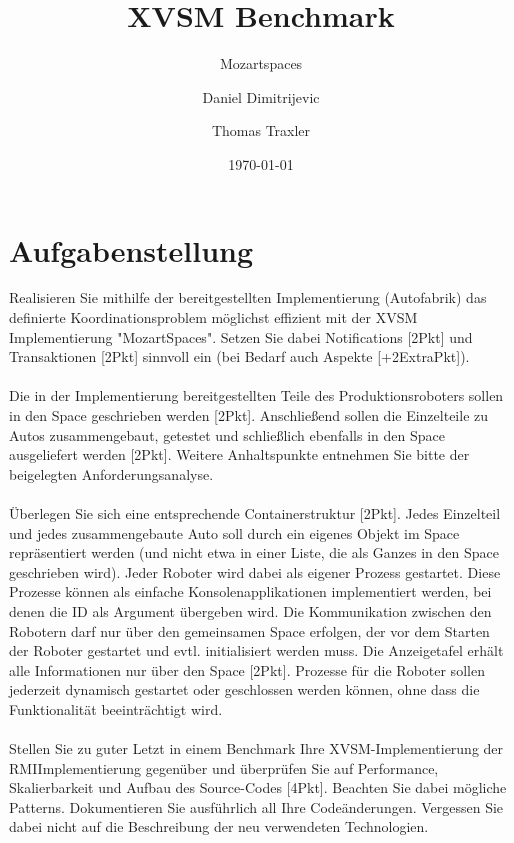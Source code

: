 \documentclass[a4paper,12pt]{scrreprt}
\begin{document}
\author{Daniel Dimitrijevic \and Thomas Traxler} %
\title{ XVSM Benchmark } %
\subject{VSDB} %
\subtitle{ Mozartspaces } %
\date{\today} %
\publishers{5AHITT} %

\maketitle
\tableofcontents


\chapter{Aufgabenstellung}
	Realisieren Sie mithilfe der bereitgestellten Implementierung (Autofabrik) das definierte 	Koordinationsproblem möglichst effizient mit der XVSM Implementierung "MozartSpaces". Setzen Sie dabei Notifications [2Pkt] und Transaktionen [2Pkt] sinnvoll ein (bei Bedarf auch Aspekte [+2ExtraPkt]).\\\\
	Die in der Implementierung bereitgestellten Teile des Produktionsroboters sollen in den Space geschrieben werden [2Pkt]. Anschließend sollen die Einzelteile zu Autos 
	zusammengebaut, getestet und schließlich ebenfalls in den Space ausgeliefert werden 
	[2Pkt]. Weitere Anhaltspunkte entnehmen Sie bitte der beigelegten Anforderungsanalyse.\\\\
	Überlegen Sie sich eine entsprechende Containerstruktur [2Pkt]. Jedes Einzelteil und jedes zusammengebaute Auto soll durch ein eigenes Objekt im Space repräsentiert werden (und nicht etwa in einer Liste, die als Ganzes in den Space geschrieben wird). Jeder Roboter wird dabei als eigener Prozess gestartet. Diese Prozesse können als einfache Konsolenapplikationen implementiert werden, bei denen die ID als Argument übergeben wird. Die Kommunikation zwischen den Robotern darf nur über den gemeinsamen Space erfolgen, der vor dem Starten der Roboter gestartet und evtl. initialisiert werden muss. Die Anzeigetafel erhält alle Informationen nur über den Space [2Pkt]. Prozesse für die Roboter sollen jederzeit dynamisch gestartet oder geschlossen werden können, ohne dass die Funktionalität beeinträchtigt wird.\\\\
	Stellen Sie zu guter Letzt in einem Benchmark Ihre XVSM-Implementierung der RMIImplementierung gegenüber und überprüfen Sie auf Performance, Skalierbarkeit und 
	Aufbau des Source-Codes [4Pkt]. Beachten Sie dabei mögliche Patterns. Dokumentieren 
	Sie ausführlich all Ihre Codeänderungen. Vergessen Sie dabei nicht auf die Beschreibung der neu verwendeten Technologien.
	
\end{document}
